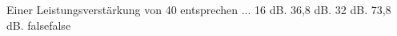     {Einer Leistungsverstärkung von 40 entsprechen ...}
    {16 dB.}
    {36,8 dB.}
    {32 dB.}
    {73,8 dB.}
    {false}{false}